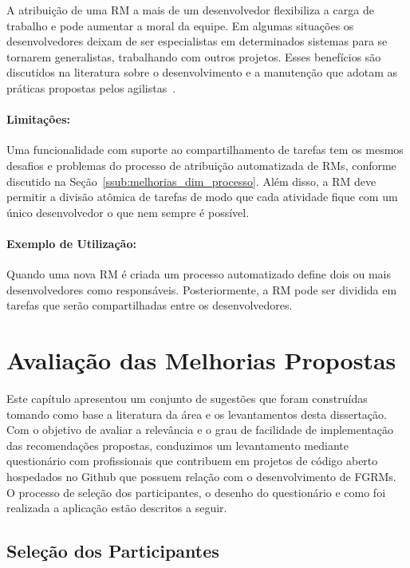 A atribuição de uma RM a mais de um desenvolvedor flexibiliza a carga de
trabalho e pode aumentar a moral da equipe. Em algumas situações os
desenvolvedores deixam de ser especialistas em determinados sistemas para se
tornarem generalistas, trabalhando com outros projetos. Esses benefícios são
discutidos na literatura sobre o desenvolvimento e a manutenção que adotam as
práticas propostas pelos agilistas~\cite{dybaa2008empirical,rudzki2009agile}.

\paragraph{Limitações:}\label{par:limitacoes_s08}

Uma funcionalidade com suporte ao compartilhamento de tarefas tem os mesmos
desafios e problemas do processo de atribuição automatizada de RMs, conforme
discutido na Seção~\ref{ssub:melhorias_dim_processo}. Além disso, a RM deve
permitir a divisão atômica de tarefas de modo que cada atividade fique com um
único desenvolvedor o que nem sempre é possível.

\paragraph{Exemplo de Utilização:}\label{par:exemplo_de_utilização_s08}

Quando uma nova RM é criada um processo automatizado define dois ou mais
desenvolvedores como responsáveis. Posteriormente, a RM pode ser dividida em
tarefas que serão compartilhadas entre os desenvolvedores.

\section{Avaliação das Melhorias Propostas}\label{sec:sug_melhoria_avaliacao_das_melhorias}

Este capítulo apresentou um conjunto de sugestões que foram construídas tomando
como base a literatura da área e os levantamentos desta dissertação. Com o
objetivo de avaliar a relevância e o grau de facilidade de implementação das
recomendações propostas, conduzimos um levantamento mediante questionário com
profissionais que contribuem em projetos de código aberto hospedados no Github
que possuem relação com o desenvolvimento de FGRMs. O processo de seleção dos
participantes, o desenho do questionário e como foi realizada a aplicação estão
descritos a seguir.

\subsection{Seleção dos Participantes}\label{ssub:sug_melhoria_selecao_participantes}

